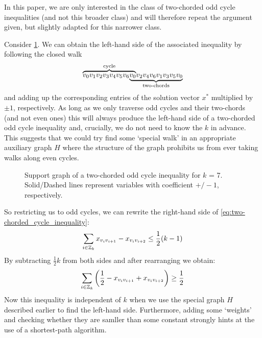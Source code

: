 In this paper, we are only interested in the class of two-chorded odd cycle inequalities (and not this broader class) and will therefore repeat the argument given, but slightly adapted for this narrower class.

Consider \cref{fig:support_graph_two-chorded_odd_cycle_inequality}.
We can obtain the left-hand side of the associated inequality by following the closed walk
\[
\mathrlap{\overbrace{\phantom{v_{0} v_{1} v_{2} v_{3} v_{4} v_{5} v_{6} v_{0}}}^{\text{cycle}}}
v_{0} v_{1} v_{2} v_{3} v_{4} v_{5} v_{6}
\mathrlap{\underbrace{\phantom{v_{0} v_{2} v_{4} v_{6} v_{1} v_{3} v_{5} v_{0}}}_{\text{two-chords}}}
v_{0} v_{2} v_{4} v_{6} v_{1} v_{3} v_{5} v_{0}
\]
and adding up the corresponding entries of the solution vector $x^{*}$ multiplied by $\pm 1$, respectively.
As long as we only traverse odd cycles and their two-chords (and not even ones) this will always produce the left-hand side of a two-chorded odd cycle inequality and, crucially, we do not need to know the $k$ in advance.
This suggests that we could try find some ‘special walk’ in an appropriate auxiliary graph $H$ where the structure of the graph prohibits us from ever taking walks along even cycles.

\begin{figure}
	\centering
	\caption[Support graph of a two-chorded odd cycle inequality]{Support graph of a two-chorded odd cycle inequality for $k$ = 7.
	Solid/Dashed lines represent variables with coefficient $+ / - 1$, respectively.}
	\label{fig:support_graph_two-chorded_odd_cycle_inequality}
\end{figure}

So restricting us to odd cycles, we can rewrite the right-hand side of \cref{eq:two-chorded_cycle_inequality}:
\begin{equation*}
	\sum_{i \in \mathbb{Z}_k} x_{v_i v_{i+1}} - x_{v_i v_{i+2}} \leq \frac{1}{2} (k-1)
\end{equation*}
By subtracting $\frac{1}{2}k$ from both sides and after rearranging we obtain:
\begin{equation}\label{eq:two-chorded_graph_weights}
	\sum_{i \in \mathbb{Z}_k} \left( \frac{1}{2} -x_{v_i v_{i+1}} + x_{v_i v_{i+2}} \right) \geq \frac{1}{2}
\end{equation}
Now this inequality is independent of $k$ when we use the special graph $H$ described earlier to find the left-hand side.
Furthermore, adding some ‘weights’ and checking whether they are samller than some constant strongly hints at the use of a shortest-path algorithm.

